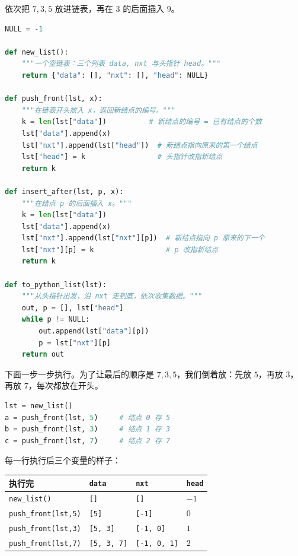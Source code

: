 \begin{example}\label{ex:data-structures:linked}
依次把 $7,3,5$ 放进链表，再在 $3$ 的后面插入 $9$。
\begin{lstlisting}[language=Python]
NULL = -1

def new_list():
    """一个空链表：三个列表 data, nxt 与头指针 head。"""
    return {"data": [], "nxt": [], "head": NULL}

def push_front(lst, x):
    """在链表开头放入 x，返回新结点的编号。"""
    k = len(lst["data"])          # 新结点的编号 = 已有结点的个数
    lst["data"].append(x)
    lst["nxt"].append(lst["head"])  # 新结点指向原来的第一个结点
    lst["head"] = k                 # 头指针改指新结点
    return k

def insert_after(lst, p, x):
    """在结点 p 的后面插入 x。"""
    k = len(lst["data"])
    lst["data"].append(x)
    lst["nxt"].append(lst["nxt"][p])  # 新结点指向 p 原来的下一个
    lst["nxt"][p] = k                 # p 改指新结点
    return k

def to_python_list(lst):
    """从头指针出发，沿 nxt 走到底，依次收集数据。"""
    out, p = [], lst["head"]
    while p != NULL:
        out.append(lst["data"][p])
        p = lst["nxt"][p]
    return out
\end{lstlisting}
\end{example}

下面一步一步执行。为了让最后的顺序是 $7,3,5$，我们倒着放：先放 $5$，再放 $3$，再放 $7$，每次都放在开头。

\begin{lstlisting}[language=Python,style=frag]
lst = new_list()
a = push_front(lst, 5)     # 结点 0 存 5
b = push_front(lst, 3)     # 结点 1 存 3
c = push_front(lst, 7)     # 结点 2 存 7
\end{lstlisting}

每一行执行后三个变量的样子：

\begin{center}
\begin{tabular}{llll}
\toprule
执行完 & \texttt{data} & \texttt{nxt} & \texttt{head} \\
\midrule
\texttt{new\_list()} & \texttt{[]} & \texttt{[]} & $-1$ \\
\texttt{push\_front(lst,5)} & \texttt{[5]} & \texttt{[-1]} & $0$ \\
\texttt{push\_front(lst,3)} & \texttt{[5, 3]} & \texttt{[-1, 0]} & $1$ \\
\texttt{push\_front(lst,7)} & \texttt{[5, 3, 7]} & \texttt{[-1, 0, 1]} & $2$ \\
\bottomrule
\end{tabular}
\end{center}

